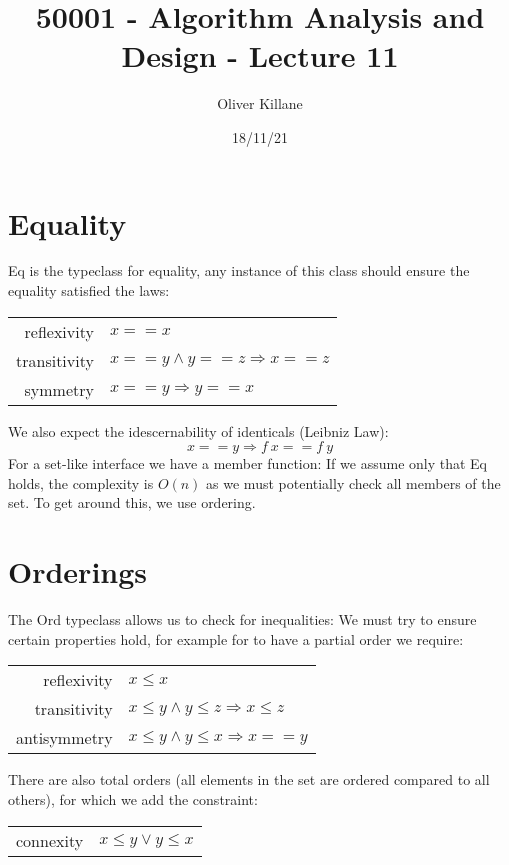 \documentclass{report}
\title{50001 - Algorithm Analysis and Design - Lecture 11}
\author{Oliver Killane}
\date{18/11/21}
\begin{document}
    \maketitle

    \section*{Equality}
        Eq is the typeclass for equality, any instance of this class should ensure the equality satisfied the laws:
        \begin{center}
            \begin{tabular}{r l}
                reflexivity & $x == x$ \\
                transitivity & $x == y \land y == z \Rightarrow x == z$ \\
                symmetry & $x == y \Rightarrow y == x$ \\
            \end{tabular}
        \end{center}
        We also expect the idescernability of identicals (Leibniz Law):
        \[x == y \Rightarrow f \ x == f \ y\]
        For a set-like interface we have a member function:
        If we assume only that Eq holds, the complexity is $O(n)$ as we must potentially check all members of the set. To get around this, we use ordering.
    
    \section*{Orderings}
        The Ord typeclass allows us to check for inequalities:
        We must try to ensure certain properties hold, for example for to have a partial order we require:
        \begin{center}
            \begin{tabular}{r l}
                reflexivity & $x \leq x$ \\
                transitivity & $x \leq y \land y \leq z \Rightarrow x \leq z$ \\
                antisymmetry & $x \leq y \land y \leq x \Rightarrow x == y$ \\
            \end{tabular}
        \end{center}
        There are also total orders (all elements in the set are ordered compared to all others), for which we add the constraint:
        \begin{center}
            \begin{tabular}{r l}
                connexity & $x \leq y \lor y \leq x$ \\
            \end{tabular}
        \end{center}
    
\end{document}

